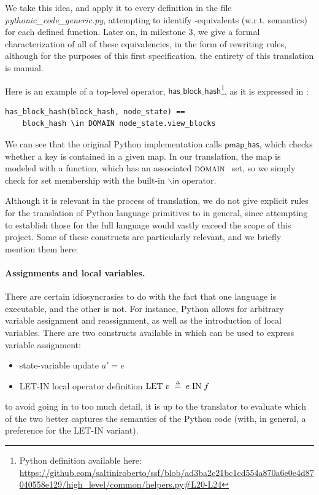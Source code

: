 We take this idea, and apply it to every definition in the file \emph{pythonic\_code\_generic.py}, attempting to identify \tlap{}-equivalents (w.r.t. semantics) for each defined function. 
Later on, in milestone 3, we give a formal characterization of all of these equivalencies, in the form of rewriting rules, although for the purposes of this first specification, the entirety of this translation is manual.

Here is an example of a top-level operator, $\mathsf{has\_block\_hash}$\footnote{Python definition available here: \url{https://github.com/saltiniroberto/ssf/blob/ad3ba2c21bc1cd554a870a6e0e4d87040558e129/high_level/common/helpers.py\#L20-L24}}, as it is expressed in \tlap{}:
\begin{lstlisting}[language=tla,columns=fullflexible]
has_block_hash(block_hash, node_state) ==
    block_hash \in DOMAIN node_state.view_blocks
\end{lstlisting}
%
We can see that the original Python implementation calls $\mathsf{pmap\_has}$, which checks whether a key is contained in a given map. In our translation, the map is modeled with a \tlap{} function, which has an associated $\textsc{domain }$ set, so we simply check for set membership with the built-in $\backslash\mathsf{in}$ operator.

Although it is relevant in the process of translation, we do not give explicit rules for the translation of Python language primitives to \tlap{} in general, since attempting to establish those for the full language would vastly exceed the scope of this project. 
Some of these constructs are particularly relevant, and we briefly mention them here:
\paragraph{Assignments and local variables.} There are certain idiosyncrasies to do with the fact that one language is executable, and the other is not. For instance, Python allows for arbitrary variable assignment and reassignment, as well as the introduction of local variables. There are two constructs available in \tlap{} which can be used to express variable assignment:
\begin{itemize}
  \item state-variable update $a' = e$
  \item LET-IN local operator definition $\mathrm{LET}\; v \;\mathrel{\smash {{\stackrel{\scriptscriptstyle\Delta}{=}}}}\; e \;\mathrm{IN}\; f$
\end{itemize}
to avoid going in to too much detail, it is up to the translator to evaluate which of the two better captures the semantics of the Python code (with, in general, a preference for the LET-IN variant).
